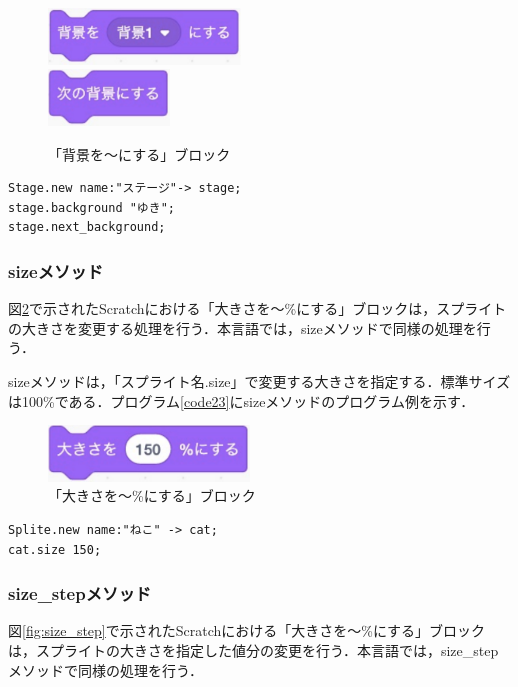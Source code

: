 \documentclass[10pt,a4j]{ltjsarticle}
\begin{document}
\begin{figure}[H]
  \centering
  \includegraphics[height=15mm]{images/set.pdf} \\
  \includegraphics[height=15mm]{images/next_set.pdf} 
  \caption{「背景を〜にする」ブロック}
  \label{fig:background}
\end{figure}

\begin{lstlisting}[caption=backgroundメソッドとnext\_backgroundメソッドのプログラム例, label=code22]
Stage.new name:"ステージ"-> stage;
stage.background "ゆき";
stage.next_background;
\end{lstlisting}

\subsubsection{sizeメソッド}
図\ref{fig:size}で示されたScratchにおける「大きさを〜\%にする」ブロックは，スプライトの大きさを変更する処理を行う．本言語では，sizeメソッドで同様の処理を行う．

sizeメソッドは，「スプライト名.size」で変更する大きさを指定する．標準サイズは100\%である．プログラム\ref{code23}にsizeメソッドのプログラム例を示す．

\begin{figure}[H]
  \centering
  \includegraphics[height=15mm]{images/size.pdf}
  \caption{「大きさを〜\%にする」ブロック}
  \label{fig:size}
\end{figure}

\begin{lstlisting}[caption=sizeメソッドのプログラム例, label=code23]
Splite.new name:"ねこ" -> cat;
cat.size 150;
\end{lstlisting}

\subsubsection{size\_stepメソッド}
図\ref{fig:size_step}で示されたScratchにおける「大きさを〜\%にする」ブロックは，スプライトの大きさを指定した値分の変更を行う．本言語では，size\_stepメソッドで同様の処理を行う．
\end{document}
